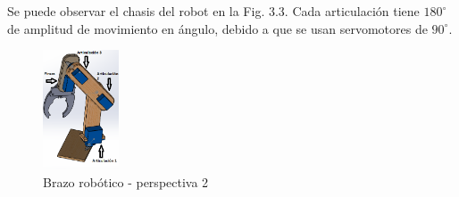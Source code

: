 \documentclass[gra_conf.tex]{subfiles}
\begin{document}
Se puede observar el chasis del robot en la Fig. 3.3. Cada articulación
tiene $180^\circ$ de amplitud de movimiento en ángulo, debido a que se 
usan servomotores de $90^\circ$.

\begin{figure}[h]
\centering
  \includegraphics[width=0.2\textwidth]{../img/Brazo2.png}
  \caption{Brazo robótico - perspectiva 2}
  \label{brazo2}
\end{figure}
\end{document}

